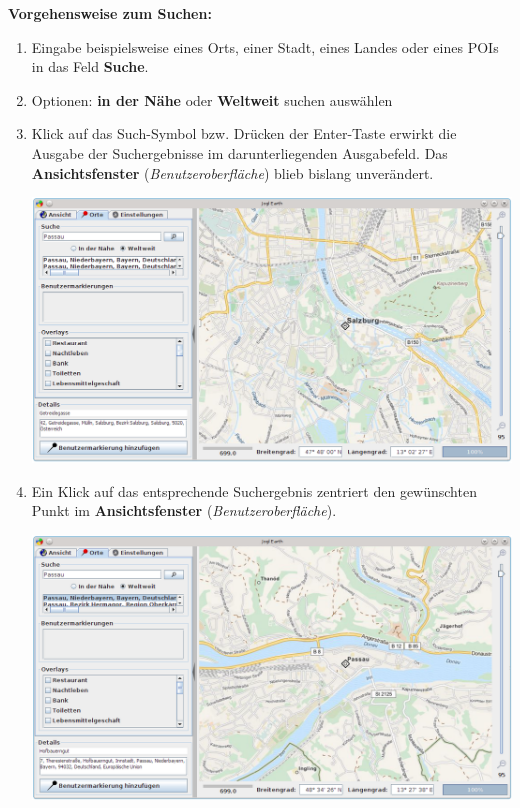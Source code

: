 \documentclass[10pt]{scrreprt}
\newcommand{\textref}[1]{\mbox{\raisebox{0.1ex}{\small$\rightarrow$ }\textit{#1}}}
\begin{document}
\newpage
\textbf{Vorgehensweise zum Suchen:}
\begin{enumerate}
\item Eingabe beispielsweise eines Orts, einer Stadt, eines Landes oder eines POIs in das Feld \textbf{Suche}.
\item Optionen: \textbf{in der Nähe} oder \textbf{Weltweit} suchen auswählen
\item Klick auf das Such-Symbol bzw. Drücken der Enter-Taste erwirkt die Ausgabe der Suchergebnisse im darunterliegenden Ausgabefeld. Das \textbf{Ansichtsfenster} (\textref{Benutzeroberfläche}) blieb bislang unverändert.
	\vspace{2mm}
	\begin{center}
	\includegraphics[scale=0.3]{images/flacheKarte_suche1.png}
	\end{center}
\item Ein Klick auf das entsprechende Suchergebnis zentriert den gewünschten Punkt im \textbf{Ansichtsfenster} (\textref{Benutzeroberfläche}).
	\vspace{2mm}
	\begin{center}
	\includegraphics[scale=0.3]{images/flacheKarte_suche2.png}
	\end{center}

\end{enumerate}
\end{document}
